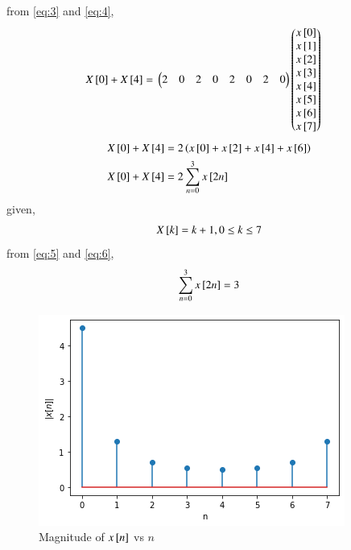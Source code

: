 \documentclass[journal,12pt,twocolumn]{IEEEtran}
\begin{document}
from \eqref{eq:3} and \eqref{eq:4},
\begin{align}
X{}\left[0\right] + X{}\left[4\right]={}&\begin{pmatrix}2&0&2&0&2&0&2&0\end{pmatrix}\begin{pmatrix}x{}\left[0\right]\\x{}\left[1\right]\\x{}\left[2\right]\\x{}\left[3\right]\\x{}\left[4\right]\\x{}\left[5\right]\\x{}\left[6\right]\\x{}\left[7\right]\end{pmatrix} 
\end{align}
\newpage 
\begin{align}
X{}\left[0\right] + X{}\left[4\right]&=2\left( x{}\left[0\right] + x{}\left[2\right] +x{}\left[4\right] + x{}\left[6\right]\right)\\
X{}\left[0\right] + X{}\left[4\right]&=2\sum_{n=0}^{3} x{}\left[2n\right] \label{eq:5}
\end{align}
given,
\begin{align}
    X{}\left[k\right]= k +1, 0 \leq k \leq 7 \label{eq:6}
\end{align}
from \eqref{eq:5} and \eqref{eq:6},
\begin{align}
   \sum_{n=0}^{3} x{}\left[2n\right] = 3
\end{align}
\begin{figure}[!ht]
    \centering
    \includegraphics[width=\columnwidth] {fig.png}
    \caption{Magnitude of $x{}\left[n\right]$ vs $n$}
\end{figure}
\end{document}
